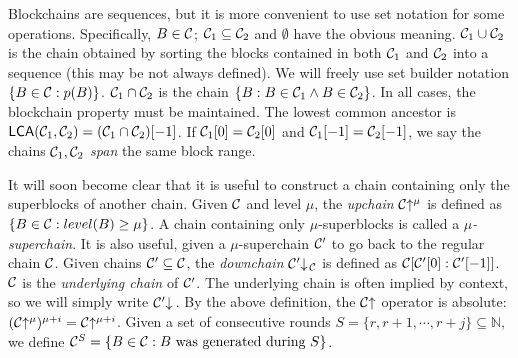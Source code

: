 Blockchains are sequences, but it is more convenient to use set notation for
some operations. Specifically, $B \in \mathcal{C}$; $\mathcal{C}_1 \subseteq \mathcal{C}_2$ and
$\emptyset$ have the obvious meaning. $\mathcal{C}_1 \cup \mathcal{C}_2$ is the chain
obtained by sorting the blocks contained in both $\mathcal{C}_1$ and $\mathcal{C}_2$ into
a sequence (this may be not always defined).
We will freely use set builder notation $\{B \in \mathcal{C}: p(B)\}$.
$\mathcal{C}_1 \cap \mathcal{C}_2$ is the
chain $\{B: B \in \mathcal{C}_1 \land B \in \mathcal{C}_2\}$. In all cases, the
blockchain property must be maintained. The lowest common ancestor is
$\textsf{LCA}(\mathcal{C}_1,
\mathcal{C}_2) = (\mathcal{C}_1 \cap \mathcal{C}_2)[-1]$.
If $\mathcal{C}_1[0] = \mathcal{C}_2[0]$ and $\mathcal{C}_1[-1] = \mathcal{C}_2[-1]$, we say the
chains $\mathcal{C}_1, \mathcal{C}_2$ \textit{span} the same block range.

It will soon become clear that it is useful to construct a chain containing only
the superblocks of another chain. Given $\mathcal{C}$ and level $\mu$, the
\textit{upchain} $\mathcal{C}\negthickspace\uparrow^\mu$ is defined as $\{B \in \mathcal{C}: level(B)
\geq \mu\}$. A chain containing only $\mu$-superblocks is called a
$\mu$\textit{-superchain}. It is also useful, given a $\mu$-superchain $\mathcal{C}'$
to go back to the regular chain $\mathcal{C}$. Given chains $\mathcal{C}' \subseteq
\mathcal{C}$, the \textit{downchain} $\mathcal{C}'\negthickspace\downarrow\,\!\!_{\mathcal{C}}$ is defined as
$\mathcal{C}[\mathcal{C}'[0]:\mathcal{C}'[-1]]$. $\mathcal{C}$ is the \textit{underlying chain} of
$\mathcal{C}'$. The underlying chain is often implied by context, so we will simply
write $\mathcal{C}'\negthickspace\downarrow\,$. By the above definition, the $\mathcal{C}\negthickspace\uparrow$
operator is absolute: $(\mathcal{C}\negthickspace\uparrow^\mu)^{\mu + i} = \mathcal{C}\negthickspace\uparrow^{\mu +
i}$. Given a set of consecutive rounds $S = \{r, r + 1, \cdots, r + j\}
\subseteq \mathbb{N}$, we define $\mathcal{C}^S = \{B \in \mathcal{C}: B \text{ was
generated during } S\}$.

